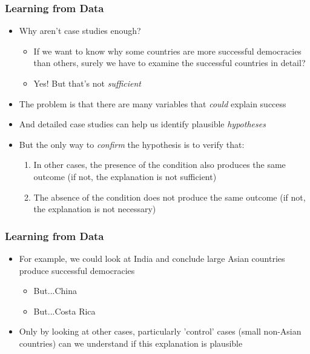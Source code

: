 \documentclass[xcolor=x11names,compress]{beamer}\usepackage[]{graphicx}\usepackage[]{color}
\renewcommand{\(}{\begin{columns}}
\renewcommand{\)}{\end{columns}}
\newcommand{\<}[1]{\begin{column}{#1}}
\renewcommand{\>}{\end{column}}
\begin{document}
\begin{frame}
\frametitle{Learning from Data}
\begin{itemize}
\item Why aren't case studies enough?
\pause
\begin{itemize}
\item If we want to know why some countries are more successful democracies than others, surely we have to examine the successful countries in detail?
\pause
\item Yes! But that's not \textit{sufficient}
\pause
\end{itemize}
\item The problem is that there are many variables that \textit{could} explain success
\pause
\item And detailed case studies can help us identify plausible \textit{hypotheses}
\pause
\item But the only way to \textit{confirm} the hypothesis is to verify that:
\pause
\begin{enumerate}
\item In other cases, the presence of the condition also produces the same outcome (if not, the explanation is not sufficient)
\pause
\item The absence of the condition does not produce the same outcome (if not, the explanation is not necessary)
\end{enumerate}
\end{itemize}
\end{frame}

\begin{frame}
\frametitle{Learning from Data}
\begin{itemize}
\item For example, we could look at India and conclude large Asian countries produce successful democracies
\pause
\begin{itemize}
\item But...China
\pause
\item But...Costa Rica
\pause
\end{itemize}
\item Only by looking at other cases, particularly 'control' cases (small non-Asian countries) can we understand if this explanation is plausible
\end{itemize}
\end{frame}
\end{document}
